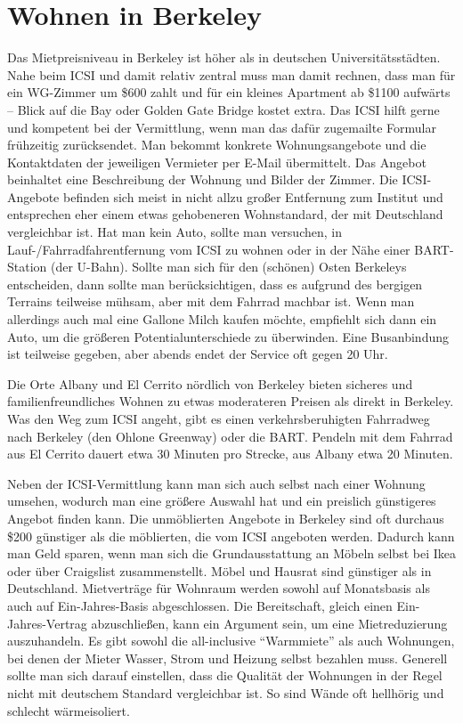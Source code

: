 \documentclass[a4paper]{scrreprt}
\begin{document}
\section{Wohnen in Berkeley}

Das Mietpreisniveau in Berkeley ist höher als in deutschen
Universitätsstädten. Nahe beim ICSI und damit relativ zentral muss man
damit rechnen, dass man für ein WG-Zimmer um \$600 zahlt und für ein
kleines Apartment ab \$1100 aufwärts -- Blick auf die Bay oder Golden
Gate Bridge kostet extra. Das ICSI hilft gerne und kompetent bei der
Vermittlung, wenn man das dafür zugemailte Formular frühzeitig
zurücksendet. Man bekommt konkrete Wohnungsangebote und die
Kontaktdaten der jeweiligen Vermieter per E-Mail übermittelt. Das
Angebot beinhaltet eine Beschreibung der Wohnung und Bilder der
Zimmer. Die ICSI-Angebote befinden sich meist in nicht allzu großer
Entfernung zum Institut und entsprechen eher einem etwas gehobeneren
Wohnstandard, der mit Deutschland vergleichbar ist. Hat man kein Auto,
sollte man versuchen, in Lauf-/Fahrradfahrentfernung vom 
ICSI zu wohnen oder in der Nähe einer BART-Station (der
U-Bahn). Sollte man sich für den (schönen) Osten Berkeleys
entscheiden, dann sollte man berücksichtigen, dass es aufgrund des
bergigen Terrains teilweise mühsam, aber mit dem Fahrrad machbar
ist. Wenn man allerdings auch mal eine Gallone Milch kaufen möchte,
empfiehlt sich dann ein Auto, um die größeren Potentialunterschiede zu
überwinden. Eine Busanbindung ist teilweise gegeben, aber abends endet
der Service oft gegen 20 Uhr.

Die Orte Albany und El Cerrito nördlich von Berkeley bieten sicheres
und familienfreundliches Wohnen zu etwas moderateren Preisen als
direkt in Berkeley. Was den Weg zum ICSI angeht, gibt es einen
verkehrsberuhigten Fahrradweg nach Berkeley (den Ohlone Greenway) oder
die BART. Pendeln mit dem Fahrrad aus El Cerrito dauert etwa 30
Minuten pro Strecke, aus Albany etwa 20 Minuten.

Neben der ICSI-Vermittlung kann man sich auch selbst nach einer
Wohnung umsehen, wodurch man eine größere Auswahl hat und ein
preislich günstigeres Angebot finden kann. Die unmöblierten Angebote
in Berkeley sind oft durchaus \$200 günstiger als die möblierten, die
vom ICSI angeboten werden. Dadurch kann man Geld sparen, wenn man sich
die Grundausstattung an Möbeln selbst bei Ikea oder über Craigslist
zusammenstellt. Möbel und Hausrat sind günstiger als in
Deutschland. Mietverträge für Wohnraum werden sowohl auf Monatsbasis
als auch auf Ein-Jahres-Basis abgeschlossen. Die Bereitschaft,
gleich einen Ein-Jahres-Vertrag abzuschließen, kann ein Argument sein,
um eine Mietreduzierung auszuhandeln. Es gibt sowohl die all-inclusive
"`Warmmiete"' als auch Wohnungen, bei denen der Mieter Wasser, Strom
und Heizung selbst bezahlen muss. Generell sollte man sich darauf
einstellen, dass die Qualität der Wohnungen in der Regel nicht mit
deutschem Standard vergleichbar ist. So sind Wände oft hellhörig und
schlecht wärmeisoliert.
\end{document}
